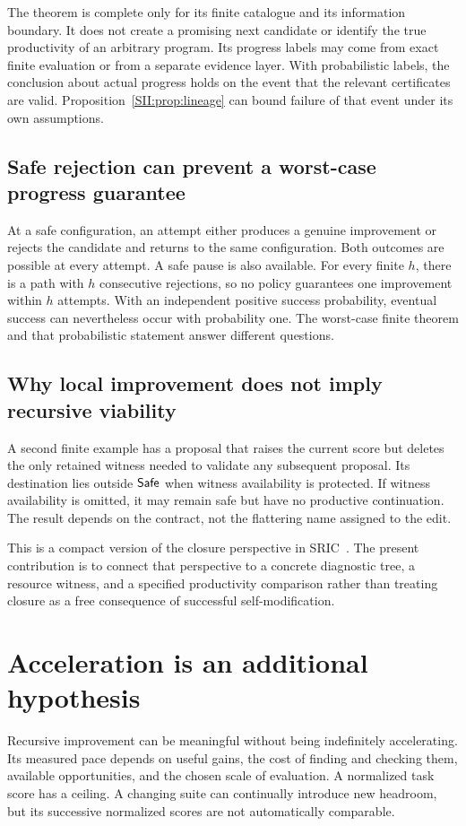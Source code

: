 The theorem is complete only for its finite catalogue and its information boundary. It does not create a promising next candidate or identify the true productivity of an arbitrary program. Its progress labels may come from exact finite evaluation or from a separate evidence layer. With probabilistic labels, the conclusion about actual progress holds on the event that the relevant certificates are valid. Proposition~\ref{SII:prop:lineage} can bound failure of that event under its own assumptions.

\subsection{Safe rejection can prevent a worst-case progress guarantee}
\begin{SIIcounterexample}\label{SII:ex:retry}
At a safe configuration, an attempt either produces a genuine improvement or rejects the candidate and returns to the same configuration. Both outcomes are possible at every attempt. A safe pause is also available. For every finite $h$, there is a path with $h$ consecutive rejections, so no policy guarantees one improvement within $h$ attempts. With an independent positive success probability, eventual success can nevertheless occur with probability one. The worst-case finite theorem and that probabilistic statement answer different questions.
\end{SIIcounterexample}

\subsection{Why local improvement does not imply recursive viability}
A second finite example has a proposal that raises the current score but deletes the only retained witness needed to validate any subsequent proposal. Its destination lies outside $\mathsf{Safe}$ when witness availability is protected. If witness availability is omitted, it may remain safe but have no productive continuation. The result depends on the contract, not the flattering name assigned to the edit.

This is a compact version of the closure perspective in SRIC~\cite{SII:sric}. The present contribution is to connect that perspective to a concrete diagnostic tree, a resource witness, and a specified productivity comparison rather than treating closure as a free consequence of successful self-modification.

\section{Acceleration is an additional hypothesis}\label{SII:sec:acceleration}
Recursive improvement can be meaningful without being indefinitely accelerating. Its measured pace depends on useful gains, the cost of finding and checking them, available opportunities, and the chosen scale of evaluation. A normalized task score has a ceiling. A changing suite can continually introduce new headroom, but its successive normalized scores are not automatically comparable.

